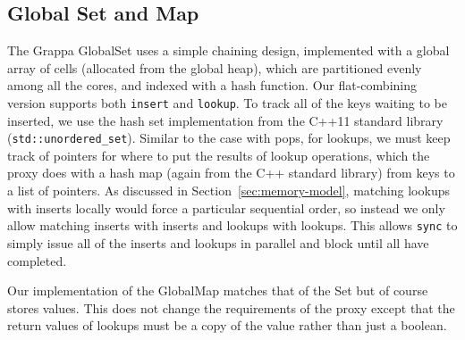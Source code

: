 \subsection{Global Set and Map}
The Grappa GlobalSet uses a simple chaining design, implemented with a global array of cells (allocated from the global heap), which are partitioned evenly among all the cores, and indexed with a hash function. Our flat-combining version supports both \texttt{insert} and \texttt{lookup}. To track all of the keys waiting to be inserted, we use the hash set implementation from the C++11 standard library (\texttt{std::unordered\_set}). Similar to the case with pops, for lookups, we must keep track of pointers for where to put the results of lookup operations, which the proxy does with a hash map (again from the C++ standard library) from keys to a list of pointers. As discussed in Section~\ref{sec:memory-model}, matching lookups with inserts locally would force a particular sequential order, so instead we only allow matching inserts with inserts and lookups with lookups. This allows \texttt{sync} to simply issue all of the inserts and lookups in parallel and block until all have completed.

Our implementation of the GlobalMap matches that of the Set but of course stores values. This does not change the requirements of the proxy except that the return values of lookups must be a copy of the value rather than just a boolean.

